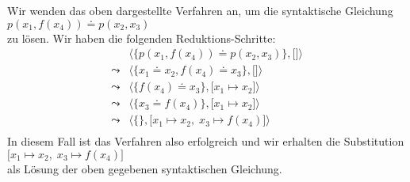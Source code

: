 \example
Wir wenden das oben dargestellte Verfahren an, um die syntaktische Gleichung \\[0.2cm]
\hspace*{1.3cm}  $p(x_1, f(x_4)) \doteq p( x_2, x_3)$  \\[0.2cm]
zu l\"{o}sen.  Wir haben die folgenden Reduktions-Schritte:
$$
\begin{array}{ll}
          &  \big\langle \big\{ p(x_1, f(x_4)) \doteq p( x_2, x_3) \big\}, \big[ \big] \big\rangle \\[0.2cm]
 \leadsto &  \big\langle \big\{ x_1 \doteq x_2, f(x_4) \doteq x_3 \big\}, \big[ \big] \big\rangle \\[0.2cm]
 \leadsto &  \big\langle \big\{ f(x_4) \doteq x_3 \big\}, \big[ x_1 \mapsto x_2 \big] \big\rangle \\[0.2cm]
 \leadsto &  \big\langle \big\{ x_3 \doteq f(x_4) \big\}, \big[ x_1 \mapsto x_2 \big] \big\rangle \\[0.2cm]
 \leadsto &  \big\langle \big\{\big\}, \big[ x_1 \mapsto x_2,\; x_3 \mapsto f(x_4) \big] \big\rangle \\[0.2cm]
\end{array}
$$
In diesem Fall ist das Verfahren also erfolgreich und wir erhalten die Substitution \\[0.2cm]
\hspace*{1.3cm} $\big[ x_1 \mapsto x_2,\; x_3 \mapsto f(x_4) \big]$ \\[0.2cm]
als L\"{o}sung der oben gegebenen syntaktischen Gleichung.  \eox

